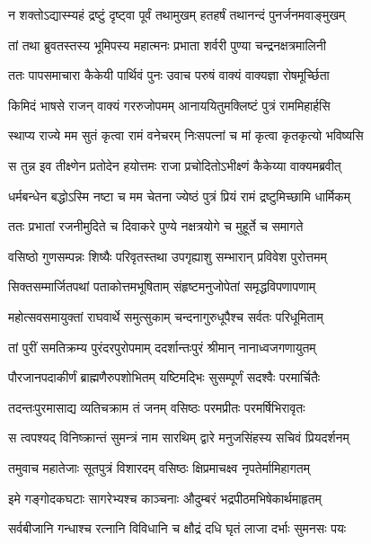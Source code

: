 \twolineshloka
{न शक्तोऽद्यास्म्यहं द्रष्टुं दृष्ट्वा पूर्वं तथामुखम्}
{हतहर्षं तथानन्दं पुनर्जनमवाङ्मुखम्} %

\twolineshloka
{तां तथा ब्रुवतस्तस्य भूमिपस्य महात्मनः}
{प्रभाता शर्वरी पुण्या चन्द्रनक्षत्रमालिनी} %

\twolineshloka
{ततः पापसमाचारा कैकेयी पार्थिवं पुनः}
{उवाच परुषं वाक्यं वाक्यज्ञा रोषमूर्च्छिता} %

\twolineshloka
{किमिदं भाषसे राजन् वाक्यं गररुजोपमम्}
{आनाययितुमक्लिष्टं पुत्रं राममिहार्हसि} %

\twolineshloka
{स्थाप्य राज्ये मम सुतं कृत्वा रामं वनेचरम्}
{निःसपत्नां च मां कृत्वा कृतकृत्यो भविष्यसि} %

\twolineshloka
{स तुन्न इव तीक्ष्णेन प्रतोदेन हयोत्तमः}
{राजा प्रचोदितोऽभीक्ष्णं कैकेय्या वाक्यमब्रवीत्} %

\twolineshloka
{धर्मबन्धेन बद्धोऽस्मि नष्टा च मम चेतना}
{ज्येष्ठं पुत्रं प्रियं रामं द्रष्टुमिच्छामि धार्मिकम्} %

\twolineshloka
{ततः प्रभातां रजनीमुदिते च दिवाकरे}
{पुण्ये नक्षत्रयोगे च मुहूर्ते च समागते} %

\twolineshloka
{वसिष्ठो गुणसम्पन्नः शिष्यैः परिवृतस्तथा}
{उपगृह्याशु सम्भारान् प्रविवेश पुरोत्तमम्} %

\twolineshloka
{सिक्तसम्मार्जितपथां पताकोत्तमभूषिताम्}
{संहृष्टमनुजोपेतां समृद्धविपणापणाम्} %

\twolineshloka
{महोत्सवसमायुक्तां राघवार्थे समुत्सुकाम्}
{चन्दनागुरुधूपैश्च सर्वतः परिधूमिताम्} %

\twolineshloka
{तां पुरीं समतिक्रम्य पुरंदरपुरोपमाम्}
{ददर्शान्तःपुरं श्रीमान् नानाध्वजगणायुतम्} %

\twolineshloka
{पौरजानपदाकीर्णं ब्राह्मणैरुपशोभितम्}
{यष्टिमद्भिः सुसम्पूर्णं सदश्वैः परमार्चितैः} %

\twolineshloka
{तदन्तःपुरमासाद्य व्यतिचक्राम तं जनम्}
{वसिष्ठः परमप्रीतः परमर्षिभिरावृतः} %

\twolineshloka
{स त्वपश्यद् विनिष्क्रान्तं सुमन्त्रं नाम सारथिम्}
{द्वारे मनुजसिंहस्य सचिवं प्रियदर्शनम्} %

\twolineshloka
{तमुवाच महातेजाः सूतपुत्रं विशारदम्}
{वसिष्ठः क्षिप्रमाचक्ष्व नृपतेर्मामिहागतम्} %

\twolineshloka
{इमे गङ्गोदकघटाः सागरेभ्यश्च काञ्चनाः}
{औदुम्बरं भद्रपीठमभिषेकार्थमाहृतम्} %

\twolineshloka
{सर्वबीजानि गन्धाश्च रत्नानि विविधानि च}
{क्षौद्रं दधि घृतं लाजा दर्भाः सुमनसः पयः} %

